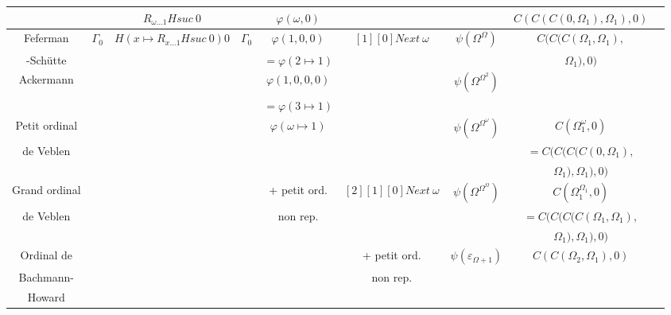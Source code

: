 \documentclass[8pt]{article}
\begin{document}
\begin{tabular}{|c|c|c|c|c|c|c|c|c|}
		&			& \(R_{\omega \ldots 1} H suc\ 0\)&			& \(\varphi(\omega,0)\)		&				&					& \(C(C(C(0,\Omega_1),\Omega_1),0)\) \\ \hline
Feferman	& \(\Gamma_0\)		& \(H (x \mapsto R_{x \ldots 1} H suc\ 0) 0\)
								& \(\Gamma_0\)			& \(\varphi(1,0,0)\)		& \([1] [0] Next\ \omega\)	& \(\psi(\Omega^\Omega)\)		& \(C(C(C(\Omega_1,\Omega_1),\) \\ 
-Schütte	&			&			&				& \(=\varphi(2 \mapsto 1)\)	&				& 					& \(\Omega_1),0)\)		\\ \hline
Ackermann	&			&			&				& \(\varphi(1,0,0,0)\)		&				& \(\psi(\Omega^{\Omega^2})\)		&				\\ 
		&			&			&				& \(=\varphi(3 \mapsto 1)\)	&				&					&				\\ \hline
Petit ordinal	&			&			&				& \(\varphi(\omega \mapsto 1)\)	&				& \(\psi(\Omega^{\Omega^\omega})\)	& \(C(\Omega_1^\omega,0)\)	\\
de Veblen	&			&			&				&				&				&					& \(=C(C(C(C(0,\Omega_1), \)	\\ 
		&			&			&				&				&				&					& \(\Omega_1),\Omega_1),0)\)	\\ \hline
Grand ordinal	&			&			&				& + petit ord.	 	 	& \([2] [1] [0] Next\ \omega\)	& \(\psi(\Omega^{\Omega^\Omega})\)	& \(C(\Omega_1^{\Omega_1},0)\)	\\
de Veblen	&			&			&				& non rep.			&				&					& \(=C(C(C(C(\Omega_1,\Omega_1),\) \\ 
		&			&			&				&				&				&					& \( \Omega_1),\Omega_1),0) \)	\\ \hline
Ordinal de	&			&			&				&				& + petit ord.			& \(\psi(\varepsilon_{\Omega+1})\)	& \(C(C(\Omega_2,\Omega_1),0)\)	\\
Bachmann-	&			&			&				&				& non rep.			&					&				\\ 
Howard		&			&			&				&				&				&					&				\\ \hline
  
\end{tabular}
\end{document}
